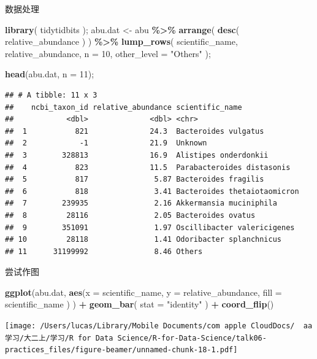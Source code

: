 \documentclass[ignorenonframetext,]{beamer}
\newenvironment{Shaded}{\begin{snugshade}}{\end{snugshade}}
\newcommand{\AttributeTok}[1]{\textcolor[rgb]{0.13,0.29,0.53}{#1}}
\newcommand{\DecValTok}[1]{\textcolor[rgb]{0.00,0.00,0.81}{#1}}
\newcommand{\FunctionTok}[1]{\textcolor[rgb]{0.13,0.29,0.53}{\textbf{#1}}}
\newcommand{\NormalTok}[1]{#1}
\newcommand{\OtherTok}[1]{\textcolor[rgb]{0.56,0.35,0.01}{#1}}
\newcommand{\SpecialCharTok}[1]{\textcolor[rgb]{0.81,0.36,0.00}{\textbf{#1}}}
\newcommand{\StringTok}[1]{\textcolor[rgb]{0.31,0.60,0.02}{#1}}
\newcommand\FontSmall{\fontsize{7}{8}\selectfont}
\begin{document}
\begin{frame}[fragile]{数据处理}
\protect\hypertarget{ux6570ux636eux5904ux7406}{}
\FontSmall

\begin{Shaded}
\begin{Highlighting}[]
\FunctionTok{library}\NormalTok{( tidytidbits );}
\NormalTok{abu.dat }\OtherTok{\textless{}{-}} 
\NormalTok{  abu }\SpecialCharTok{\%\textgreater{}\%} \FunctionTok{arrange}\NormalTok{( }\FunctionTok{desc}\NormalTok{( relative\_abundance ) ) }\SpecialCharTok{\%\textgreater{}\%} 
    \FunctionTok{lump\_rows}\NormalTok{( scientific\_name, relative\_abundance, }\AttributeTok{n =} \DecValTok{10}\NormalTok{, }\AttributeTok{other\_level =} \StringTok{"Others"}\NormalTok{ );}

\FunctionTok{head}\NormalTok{(abu.dat, }\AttributeTok{n =} \DecValTok{11}\NormalTok{);}
\end{Highlighting}
\end{Shaded}

\begin{verbatim}
## # A tibble: 11 x 3
##    ncbi_taxon_id relative_abundance scientific_name             
##            <dbl>              <dbl> <chr>                       
##  1           821              24.3  Bacteroides vulgatus        
##  2            -1              21.9  Unknown                     
##  3        328813              16.9  Alistipes onderdonkii       
##  4           823              11.5  Parabacteroides distasonis  
##  5           817               5.87 Bacteroides fragilis        
##  6           818               3.41 Bacteroides thetaiotaomicron
##  7        239935               2.16 Akkermansia muciniphila     
##  8         28116               2.05 Bacteroides ovatus          
##  9        351091               1.97 Oscillibacter valericigenes 
## 10         28118               1.41 Odoribacter splanchnicus    
## 11      31199992               8.46 Others
\end{verbatim}
\end{frame}

\begin{frame}[fragile]{尝试作图}
\protect\hypertarget{ux5c1dux8bd5ux4f5cux56fe}{}
\FontSmall

\begin{Shaded}
\begin{Highlighting}[]
\FunctionTok{ggplot}\NormalTok{(abu.dat, }\FunctionTok{aes}\NormalTok{(}\AttributeTok{x =}\NormalTok{ scientific\_name, }\AttributeTok{y =}\NormalTok{ relative\_abundance, }\AttributeTok{fill =}\NormalTok{ scientific\_name ) ) }\SpecialCharTok{+} 
  \FunctionTok{geom\_bar}\NormalTok{( }\AttributeTok{stat =} \StringTok{"identity"}\NormalTok{ ) }\SpecialCharTok{+} 
  \FunctionTok{coord\_flip}\NormalTok{()}
\end{Highlighting}
\end{Shaded}

\texttt{[image: /Users/lucas/Library/Mobile Documents/com~apple~CloudDocs/~~aa学习/大二上/学习/R for Data Science/R-for-Data-Science/talk06-practices\_files/figure-beamer/unnamed-chunk-18-1.pdf]}
\end{frame}
\end{document}
